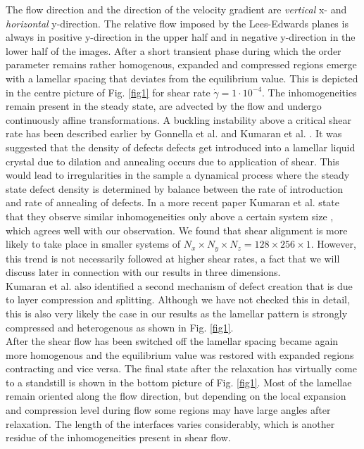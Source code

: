 \documentclass[8.5pt,twoside,twocolumn]{article}
\newcommand{\e}[1]{\cdot10^{#1}}
\newcommand{\gd}{\dot{\gamma}}
\begin{document}
The flow direction and the direction of the velocity gradient are {\it vertical} x- and {\it horizontal} y-direction.
The relative flow imposed by the Lees-Edwards planes is always in positive y-direction in the upper half and in negative y-direction in the lower half of the images.
After a short transient phase during which the order parameter remains rather homogenous, expanded and compressed regions emerge with a lamellar spacing that deviates from the equilibrium value.
This is depicted in the centre picture of Fig. \ref{fig1} for shear rate $\gd= 1\e{-4}$.
The inhomogeneities remain present in the steady state, are advected by the flow and undergo continuously affine transformations.
A buckling instability above a critical shear rate has been described earlier by Gonnella et al. \cite{Gonnella98} and Kumaran et al. \cite{Kumaran2001}.
It was suggested that the density of defects defects get introduced into a lamellar liquid crystal due to dilation and annealing occurs due to application of shear.
This would lead to irregularities in the sample a dynamical process where the steady state defect density is determined by balance between the rate of introduction and rate of annealing of defects.
In a more recent paper Kumaran et al. state that they observe similar inhomogeneities only above a certain system size \cite{Kumaran2011}, which agrees well with our observation.
We found that shear alignment is more likely to take place in smaller systems of $N_x\times N_y\times N_z=128\times 256\times 1$.
However, this trend is not necessarily followed at higher shear rates, a fact that we will discuss later in connection with our results in three dimensions.\\
Kumaran et al. also identified a second mechanism of defect creation that is due to layer compression and splitting.
Although we have not checked this in detail, this is also very likely the case in our results as the lamellar pattern is strongly compressed and heterogenous as shown in Fig. \ref{fig1}.\\
After the shear flow has been switched off the lamellar spacing became again more homogenous and the equilibrium value was restored with expanded regions contracting and vice versa.
The final state after the relaxation has virtually come to a standstill is shown in the bottom picture of Fig. \ref{fig1}. 
Most of the lamellae remain oriented along the flow direction, but depending on the local expansion and compression level during flow some regions may have large angles after relaxation. 
The length of the interfaces varies considerably, which is another residue of the inhomogeneities present in shear flow.\\
\end{document}
